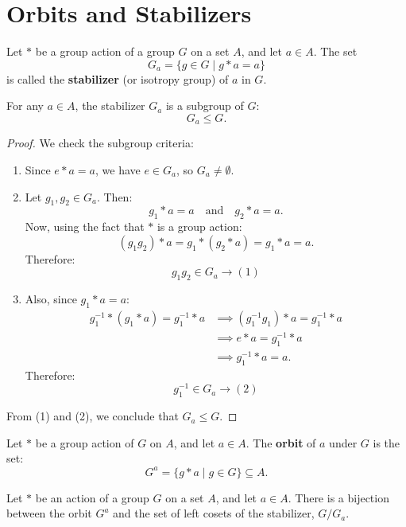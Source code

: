 \section{Orbits and Stabilizers}

\begin{definition}[Stabilizer]
Let $*$ be a group action of a group $G$ on a set $A$, and let $a \in A$. The set
\[
G_a = \{g \in G \mid g * a = a\}
\]
is called the \textbf{stabilizer} (or isotropy group) of $a$ in $G$.
\end{definition}

\begin{theorem}
For any $a \in A$, the stabilizer $G_a$ is a subgroup of $G$:
\[
G_a \le G.
\]
\end{theorem}

\begin{proof}
We check the subgroup criteria:
\begin{enumerate}[label=(\roman*)]
    \item Since $e * a = a$, we have $e \in G_a$, so $G_a \neq \emptyset$.
    
    \item Let $g_1, g_2 \in G_a$. Then:
    \[
    g_1 * a = a \quad \text{and} \quad g_2 * a = a.
    \]
    Now, using the fact that $*$ is a group action:
    \[
    (g_1 g_2) * a = g_1 * (g_2 * a) = g_1 * a = a.
    \]
    Therefore:
    \[
    g_1 g_2 \in G_a \longrightarrow (1)
    \]
    
    \item Also, since $g_1 * a = a$:
    \begin{align*}
    g_1^{-1} * (g_1 * a) = g_1^{-1} * a &\implies (g_1^{-1} g_1) * a = g_1^{-1} * a \\
    &\implies e * a = g_1^{-1} * a \\
    &\implies g_1^{-1} * a = a.
    \end{align*}
    Therefore:
    \[
    g_1^{-1} \in G_a \longrightarrow (2)
    \]
\end{enumerate}
From (1) and (2), we conclude that $G_a \le G$.
\end{proof}

\begin{definition}[Orbit]
Let $*$ be a group action of $G$ on $A$, and let $a \in A$. The \textbf{orbit} of $a$ under $G$ is the set:
\[
G^a = \{g * a \mid g \in G\} \subseteq A.
\]
\end{definition}

\begin{theorem}
Let $*$ be an action of a group $G$ on a set $A$, and let $a \in A$. There is a bijection between the orbit $G^a$ and the set of left cosets of the stabilizer, $G/G_a$.
\end{theorem}

